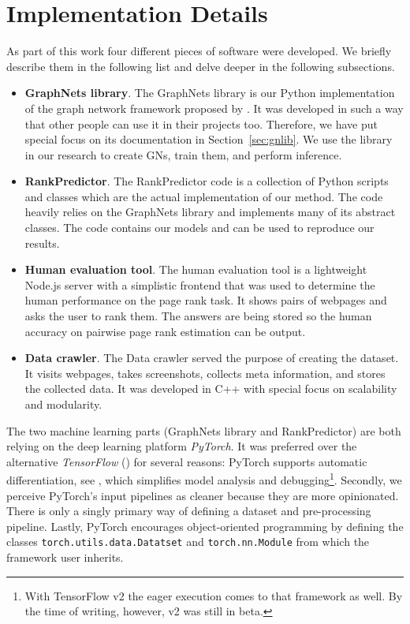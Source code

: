 \section{Implementation Details}
\label{sec:implementationdetails}

As part of this work four different pieces of software were developed. We briefly describe them in the following list and delve deeper in the following subsections.

\begin{itemize}
    \item \textbf{GraphNets library}. The GraphNets library is our Python implementation of the graph network framework proposed by \cite{deepmind:graphnets}. It was developed in such a way that other people can use it in their projects too. Therefore, we have put special focus on its documentation in Section~\ref{sec:gnlib}. We use the library in our research to create GNs, train them, and perform inference.
    \item \textbf{RankPredictor}. The RankPredictor code is a collection of Python scripts and classes which are the actual implementation of our method. The code heavily relies on the GraphNets library and implements many of its abstract classes. The code contains our models and can be used to reproduce our results.
    \item \textbf{Human evaluation tool}. The human evaluation tool is a lightweight Node.js server with a simplistic frontend that was used to determine the human performance on the page rank task. It shows pairs of webpages and asks the user to rank them. The answers are being stored so the human accuracy on pairwise page rank estimation can be output.
    \item \textbf{Data crawler}. The Data crawler served the purpose of creating the dataset. It visits webpages, takes screenshots, collects meta information, and stores the collected data. It was developed in C++ with special focus on scalability and modularity.
\end{itemize}

The two machine learning parts (GraphNets library and RankPredictor) are both relying on the deep learning platform \textit{PyTorch}. It was preferred over the alternative \textit{TensorFlow} (\cite{abadi2016:tensorflow}) for several reasons: PyTorch supports automatic differentiation, see \cite{paszke2017automatic:pytorch}, which simplifies model analysis and debugging\footnote{With TensorFlow v2 the eager execution comes to that framework as well. By the time of writing, however, v2 was still in beta.}. Secondly, we perceive PyTorch's input pipelines as cleaner because they are more opinionated. There is only a singly primary way of defining a dataset and pre-processing pipeline. Lastly, PyTorch encourages object-oriented programming by defining the classes \texttt{torch.utils.data.Datatset} and \texttt{torch.nn.Module} from which the framework user inherits.





